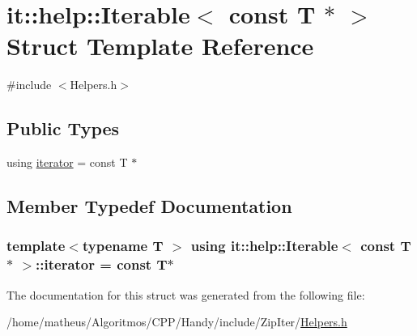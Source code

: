 \hypertarget{structit_1_1help_1_1Iterable_3_01const_01T_01_5_01_4}{}\section{it\+:\+:help\+:\+:Iterable$<$ const T $\ast$ $>$ Struct Template Reference}
\label{structit_1_1help_1_1Iterable_3_01const_01T_01_5_01_4}


{\ttfamily \#include $<$Helpers.\+h$>$}

\subsection*{Public Types}
\begin{DoxyCompactItemize}
\item 
using \hyperlink{structit_1_1help_1_1Iterable_3_01const_01T_01_5_01_4_ae1c626ae93b53f527f15dfe9341ce555}{iterator} = const T $\ast$
\end{DoxyCompactItemize}


\subsection{Member Typedef Documentation}
\subsubsection[{\texorpdfstring{iterator}{iterator}}]{\setlength{\rightskip}{0pt plus 5cm}template$<$typename T $>$ using {\bf it\+::help\+::\+Iterable}$<$ const T $\ast$ $>$\+::{\bf iterator} =  const T$\ast$}\hypertarget{structit_1_1help_1_1Iterable_3_01const_01T_01_5_01_4_ae1c626ae93b53f527f15dfe9341ce555}{}\label{structit_1_1help_1_1Iterable_3_01const_01T_01_5_01_4_ae1c626ae93b53f527f15dfe9341ce555}


The documentation for this struct was generated from the following file\+:\begin{DoxyCompactItemize}
\item 
/home/matheus/\+Algoritmos/\+C\+P\+P/\+Handy/include/\+Zip\+Iter/\hyperlink{ZipIter_2Helpers_8h}{Helpers.\+h}\end{DoxyCompactItemize}

